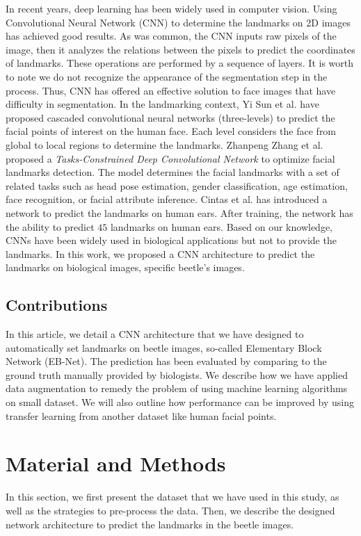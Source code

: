 \documentclass[review]{elsarticle}
\begin{document}
In recent years, deep learning has been widely used in computer vision. Using Convolutional Neural Network (CNN) to determine the landmarks on 2D images has achieved good results. As was common, the CNN inputs raw pixels of the image, then it analyzes the relations between the pixels to predict the coordinates of landmarks. These operations are performed by a sequence of layers. It is worth to note we do not recognize the appearance of the segmentation step in the process. Thus, CNN has offered an effective solution to face images that have difficulty in segmentation. In the landmarking context, Yi Sun et al. \cite{sun2013deep} have proposed cascaded convolutional neural networks (three-levels) to predict the facial points of interest on the human face. Each level considers the face from global to local regions to determine the landmarks. Zhanpeng Zhang et al. \cite{zhang2014facial} proposed a \textit{Tasks-Constrained Deep Convolutional Network} to optimize facial landmarks detection. The model determines the facial landmarks with a set of related tasks such as head pose estimation, gender classification, age estimation, face recognition, or facial attribute inference. Cintas et al. \cite{cintas2016automatic} has introduced a network to predict the landmarks on human ears. After training, the network has the ability to predict $45$ landmarks on human ears. Based on our knowledge, CNNs have been widely used in biological applications but not to provide the landmarks. In this work, we proposed a CNN architecture to predict the landmarks on biological images, specific beetle's images.

\subsection{Contributions}
In this article, we detail a CNN architecture that we have designed to
automatically set landmarks on beetle images, so-called Elementary
Block Network (EB-Net). The prediction has been evaluated by comparing
to the ground truth manually provided by biologists. We describe how
we have applied data augmentation to remedy the problem of using
machine learning algorithms on small dataset. We will also outline
how performance can be improved by using transfer learning from
another dataset like human facial points.


\section{Material and Methods}
\label{sec2}
In this section, we first present the dataset that we have used in this study, as well as the strategies to pre-process the data. Then, we describe the designed network architecture to predict the landmarks in the beetle images.
\end{document}
